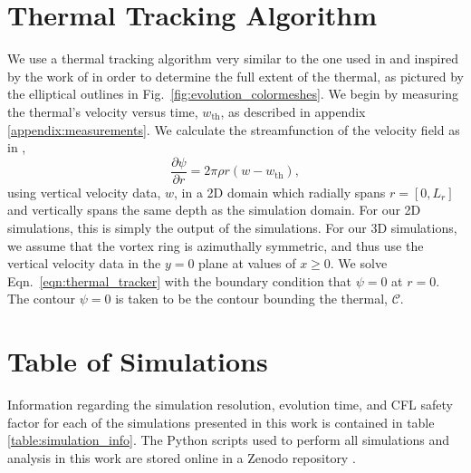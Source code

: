 \documentclass[twocolumn, amsmath, amsfonts, amssymb, trackchanges]{aastex62}
\begin{document}
\section{Thermal Tracking Algorithm}
\label{appendix:tracking}
We use a thermal tracking algorithm very similar to the one used in  \citet{lecoanet&jeevanjee2018} and inspired by the work of \citet{romps&all2015} in order to determine the full extent of the thermal, as pictured by the elliptical outlines in Fig.~\ref{fig:evolution_colormeshes}. 
We begin by measuring the thermal's velocity versus time, $w_{\text{th}}$, as described in appendix \ref{appendix:measurements}. 
We calculate the streamfunction of the velocity field as in \citet{romps&all2015},
\begin{equation}
\frac{\partial \psi}{\partial r} = 2\pi \rho r (w - w_{\text{th}}),
\label{eqn:thermal_tracker}
\end{equation}
using vertical velocity data, $w$, in a 2D domain which radially spans $r = [0, L_r]$ and vertically spans the same depth as the simulation domain.
For our 2D simulations, this is simply the output of the simulations.
For our 3D simulations, we assume that the vortex ring is azimuthally symmetric, and thus use the vertical velocity data in the $y = 0$ plane at values of $x \geq 0$.
We solve Eqn.~\ref{eqn:thermal_tracker} with the boundary condition that $\psi = 0$ at $r = 0$. 
The contour $\psi = 0$ is taken to be the contour bounding the thermal, $\mathcal{C}$.

\section{Table of Simulations}
\label{appendix:table}
Information regarding the simulation resolution, evolution time, and CFL safety factor for each of the simulations presented in this work is contained in table \ref{table:simulation_info}.
The Python scripts used to perform all simulations and analysis in this work are stored online in a Zenodo repository  \citep{supp_andersetall2019}.
\end{document}
